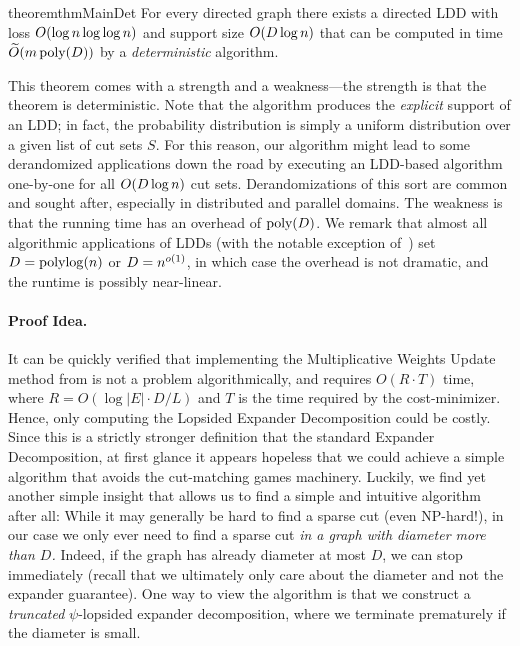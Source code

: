 \documentclass[letterpaper,11pt]{article}
\begin{document}
\begin{restatable}{theorem}{thmMainDet} \label{thm:main-det}
	For every directed graph there exists a directed LDD with loss $O(\log n \log\log n)$ and support size $O(D \log n)$ that can be computed in time $\widetilde{O}(m \operatorname{\text{{\rm poly}}}(D))$ by a \emph{deterministic} algorithm.
\end{restatable}

This theorem comes with a strength and a weakness---the strength is that the theorem is deterministic. Note that the algorithm produces the \emph{explicit} support of an LDD; in fact, the probability distribution is simply a uniform distribution over a given list of cut sets $S$. For this reason, our algorithm might lead to some derandomized applications down the road by executing an LDD-based algorithm one-by-one for all $O(D \log n)$ cut sets. Derandomizations of this sort are common and sought after, especially in distributed and parallel domains. The weakness is that the running time has an overhead of $\operatorname{\text{{\rm poly}}}(D)$. We remark that almost all algorithmic applications of LDDs (with the notable exception of~\cite{BernsteinNW22}) set $D = \operatorname{polylog}(n)$ or $D = n^{o(1)}$, in which case the overhead is not dramatic, and the runtime is possibly near-linear.

\paragraph{Proof Idea.}
It can be quickly verified that implementing the Multiplicative Weights Update method from  is not a problem algorithmically, and requires $O(R \cdot T)$ time, where $R=O(\log |E| \cdot D/L)$ and $T$ is the time required by the cost-minimizer. Hence, only computing the Lopsided Expander Decomposition could be costly. Since this is a strictly stronger definition that the standard Expander Decomposition, at first glance it appears hopeless that we could achieve a simple algorithm that avoids the cut-matching games machinery. Luckily, we find yet another simple insight that allows us to find a simple and intuitive algorithm after all: While it may generally be hard to find a sparse cut (even NP-hard!), in our case we only ever need to find a sparse cut \emph{in a graph with diameter more than $D$.} Indeed, if the graph has already diameter at most $D$, we can stop immediately (recall that we ultimately only care about the diameter and not the expander guarantee). One way to view the algorithm is that we construct a \emph{truncated} $\psi$-lopsided expander decomposition, where we terminate prematurely if the diameter is small.
\end{document}
